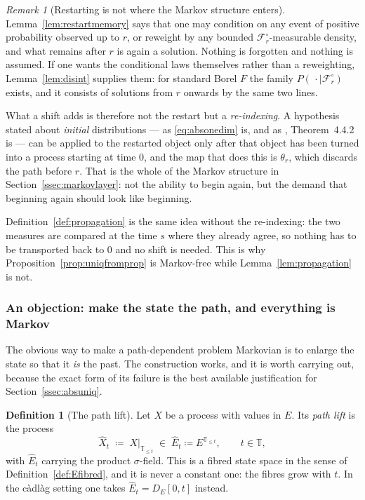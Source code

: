 \documentclass[11pt,a4paper]{article}
\theoremstyle{plain}
\theoremstyle{definition}
\newtheorem{definition}[theorem]{Definition}
\theoremstyle{remark}
\newtheorem{remark}[theorem]{Remark}
\newcommand{\T}{\mathbb{T}}                     %
\newcommand{\Filt}{\mathcal{F}}
\newcommand{\EK}{\cite{EK86}}
\begin{document}
\begin{remark}[Restarting is not where the Markov structure enters]
  \label{rem:restartnomarkov}
  Lemma~\ref{lem:restartmemory} says that one may condition on any event of
  positive probability observed up to $r$, or reweight by any bounded
  $\Filt^\circ_r$-measurable density, and what remains after $r$ is again a
  solution.  Nothing is forgotten and nothing is assumed.  If one wants the
  conditional laws themselves rather than a reweighting,
  Lemma~\ref{lem:disint} supplies them: for standard Borel $F$ the family
  $P(\,\cdot \mid \Filt^\circ_r)$ exists, and it consists of solutions from $r$
  onwards by the same two lines.

  What a shift adds is therefore not the restart but a \emph{re-indexing}.  A
  hypothesis stated about \emph{initial} distributions --- as
  \eqref{eq:absonedim} is, and as \EK, Theorem~4.4.2 is --- can be applied to the
  restarted object only after that object has been turned into a process starting
  at time $0$, and the map that does this is $\theta_r$, which discards the path
  before $r$.  That is the whole of the Markov structure in
  Section~\ref{ssec:markovlayer}: not the ability to begin again, but the demand
  that beginning again should look like beginning.

  Definition~\ref{def:propagation} is the same idea without the re-indexing: the
  two measures are compared at the time $s$ where they already agree, so nothing
  has to be transported back to $0$ and no shift is needed.  This is why
  Proposition~\ref{prop:uniqfromprop} is Markov-free while
  Lemma~\ref{lem:propagation} is not.
\end{remark}

\subsubsection*{An objection: make the state the path, and everything is Markov}

The obvious way to make a path-dependent problem Markovian is to enlarge the
state so that it \emph{is} the past.  The construction works, and it is worth
carrying out, because the exact form of its failure is the best available
justification for Section~\ref{ssec:absuniq}.

\begin{definition}[The path lift]
  \label{def:pathlift}
  Let $X$ be a process with values in $E$.  Its \emph{path lift} is the process
  \[
    \hat{X}_t \;\coloneqq\; X|_{\T_{\leq t}} \;\in\; \hat{E}_t \coloneqq E^{\T_{\leq t}} ,
    \qquad t \in \T ,
  \]
  with $\hat{E}_t$ carrying the product $\sigma$-field.  This is a fibred state
  space in the sense of Definition~\ref{def:Efibred}, and it is never a constant
  one: the fibres grow with $t$.  In the c\`adl\`ag setting one takes
  $\hat{E}_t = D_E[0,t]$ instead.
\end{definition}
\end{document}
